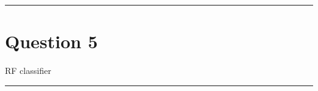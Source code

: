 \clearpage
\rule{\textwidth}{1mm}
\vspace{-2em}
\section{Question 5 } RF classifier
\newline
\rule{\textwidth}{1mm}

